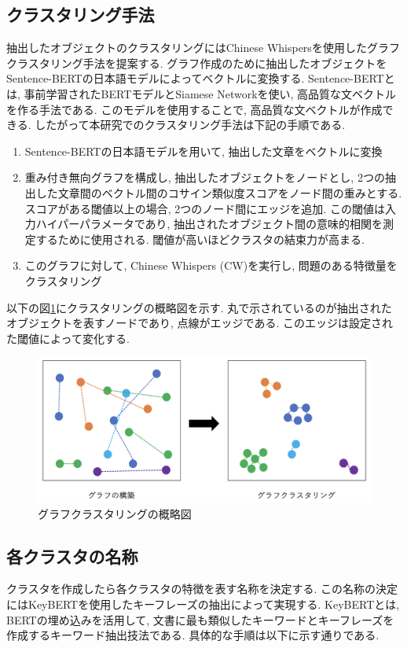 \subsection{クラスタリング手法}
抽出したオブジェクトのクラスタリングにはChinese Whispers\cite{chinese-whispers}を使用したグラフクラスタリング手法を提案する. グラフ作成のために抽出したオブジェクトをSentence-BERTの日本語モデルによってベクトルに変換する. Sentence-BERT\cite{sentence-bert}とは, 事前学習されたBERTモデルとSiamese Networkを使い, 高品質な文ベクトルを作る手法である. このモデルを使用することで, 高品質な文ベクトルが作成できる. 
したがって本研究でのクラスタリング手法は下記の手順である. 
\begin{enumerate}
  \item Sentence-BERTの日本語モデルを用いて, 抽出した文章をベクトルに変換
  \item 重み付き無向グラフを構成し, 抽出したオブジェクトをノードとし, 2つの抽出した文章間のベクトル間のコサイン類似度スコアをノード間の重みとする. スコアがある閾値以上の場合, 2つのノード間にエッジを追加. この閾値は入力ハイパーパラメータであり, 抽出されたオブジェクト間の意味的相関を測定するために使用される. 閾値が高いほどクラスタの結束力が高まる. 
  \item このグラフに対して, Chinese Whispers (CW)を実行し, 問題のある特徴量をクラスタリング
\end{enumerate}

以下の図\ref{fig:clustering}にクラスタリングの概略図を示す. 丸で示されているのが抽出されたオブジェクトを表すノードであり, 点線がエッジである. このエッジは設定された閾値によって変化する. 
\begin{figure}[hbtp]
  \centering
  \includegraphics[scale=0.4]
       {contents/images/clustering.png}
  \caption{グラフクラスタリングの概略図\label{fig:clustering}}
\end{figure}

\subsection{各クラスタの名称}
クラスタを作成したら各クラスタの特徴を表す名称を決定する. 
この名称の決定にはKeyBERT\cite{keybert}を使用したキーフレーズの抽出によって実現する. KeyBERTとは, BERTの埋め込みを活用して, 文書に最も類似したキーワードとキーフレーズを作成するキーワード抽出技法である. 
具体的な手順は以下に示す通りである. 

